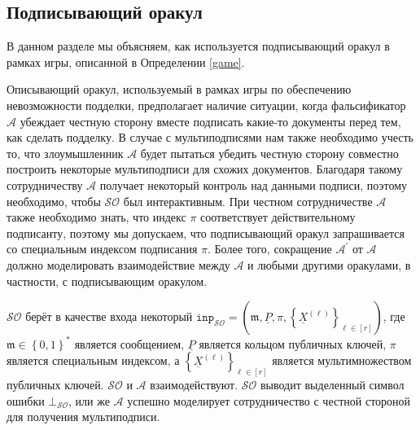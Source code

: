 \documentclass{mrl}
\theoremstyle{definition}
\numberwithin{theorem}{subsection}
\newcommand{\adversary}{\mathcal{A}}
\newcommand{\m}{\mathfrak{m}}
\begin{document}
\subsection{Подписывающий оракул}\label{sigoracle}

В данном разделе мы объясняем, как используется подписывающий оракул в рамках игры, описанной в Определении \ref{game}.

Описывающий оракул, используемый в рамках игры по обеспечению невозможности подделки, предполагает наличие ситуации, когда фальсификатор $\adversary$ убеждает честную сторону вместе подписать какие-то документы перед тем, как сделать подделку. В случае с мультиподписями нам также необходимо учесть то, что злоумышленник $\adversary$ будет пытаться убедить честную сторону совместно построить некоторые мультиподписи для схожих документов. Благодаря такому сотрудничеству $\adversary$ получает некоторый контроль над данными подписи, поэтому необходимо, чтобы $\mathcal{SO}$ был интерактивным. При честном сотрудничестве $\adversary$ также необходимо знать, что индекс $\pi$ соответствует действительному подписанту, поэтому мы допускаем, что подписывающий оракул запрашивается со специальным индексом подписания $\pi$. Более того, сокращение $\adversary^\prime$ от $\adversary$ должно моделировать взаимодействие между $\adversary$ и любыми другими оракулами, в частности, с подписывающим оракулом.

$\mathcal{SO}$ берёт в качестве входа некоторый $\texttt{inp}_{\mathcal{SO}} = (\m, \underline{P}, \pi, \left\{\underline{X}^{(\ell)}\right\}_{\ell \in [r]})$, где $\m \in \left\{0,1\right\}^*$ является сообщением, $\underline{P}$ является кольцом публичных ключей, $\pi$ является специальным индексом, а $\left\{\underline{X}^{(\ell)}\right\}_{\ell \in [r]}$ является мультимножеством публичных ключей. $\mathcal{SO}$ и $\adversary$ взаимодействуют. $\mathcal{SO}$ выводит выделенный символ ошибки $\bot_{\mathcal{SO}}$, или же $\adversary$ успешно моделирует сотрудничество с честной стороной для получения мультиподписи.
\end{document}
